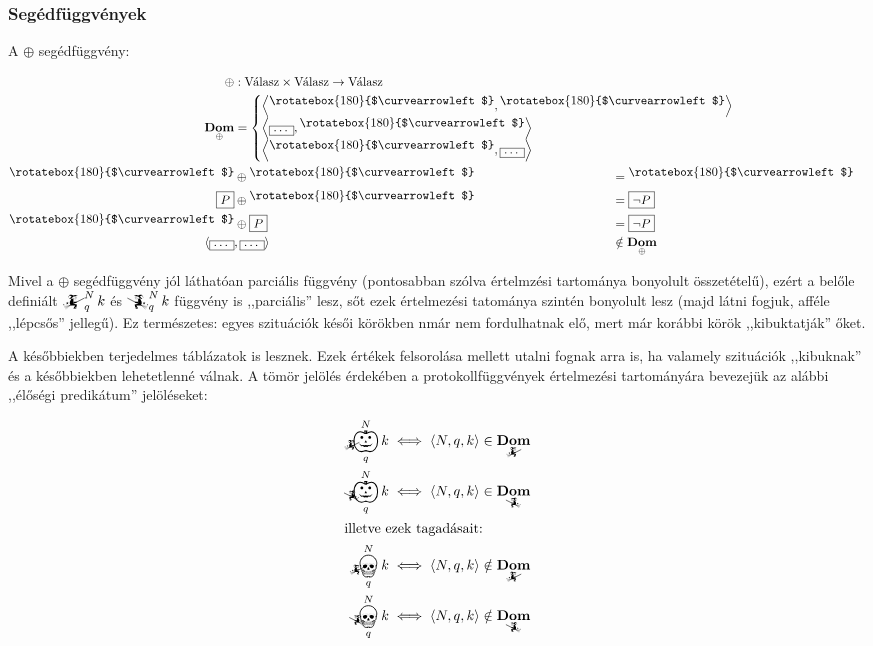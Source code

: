 \documentclass{article}
\newcommand{\nothing}{\text{\raisebox{0.4em}{\rotatebox{180}{$\curvearrowleft$}}}}%
\newcommand{\just}[1]{\boxed{#1}}%
\DeclareMathOperator{\dom}{\mathbf{Dom}}
\newcommand{\angled}[1]{\left\langle#1\right\rangle}
\newcommand{\mainfunA}[3]{\mathwitch_{#2}^{#1}#3}
\newcommand{\mainfunB}[3]{\reversemathwitch_{#2}^{#1}#3}
\newcommand{\nomainfunA}[3]{{}_{\mathwitch}\!\!\!\!\bigskull^{#1}_{#2}#3}
\newcommand{\nomainfunB}[3]{{}_{\reversemathwitch}\!\!\!\!\bigskull^{#1}_{#2}#3}
\newcommand{\yesmainfunA}[3]{{}_{\mathwitch}\!\!\!\!\bigpumpkin^{#1}_{#2}#3}
\newcommand{\yesmainfunB}[3]{{}_{\reversemathwitch}\!\!\!\!\bigpumpkin^{#1}_{#2}#3}
\begin{document}
	\subsubsection{Segédfüggvények}

	A $\oplus$ segédfüggvény:

	\begin{align*}
		\oplus &: \text{Válasz} \times \text{Válasz} \to \text{Válasz}\\
		\dom_\oplus &= \begin{cases}\angled{\nothing, \nothing}&\\\angled{\just\dots, \nothing}&\\\angled{\nothing, \just\dots}&\end{cases}\\
		\nothing   &\oplus \nothing            & &\mspace{-214mu}=  \nothing   \\
		\just P &\oplus \nothing            & &\mspace{-214mu}=  \just{\lnot P} \\
		\nothing   &\oplus \just P          & &\mspace{-214mu}=  \just{\lnot P} \\
		\langle\just\dots &, \just\dots\rangle & &\mspace{-214mu}\notin \dom_\oplus
	\end{align*}

	Mivel a $\oplus$ segédfüggvény jól láthatóan parciális függvény (pontosabban szólva értelmzési tartománya bonyolult összetételű), ezért a belőle definiált $\mainfunA Nqk$ és $\mainfunB Nqk$ függvény is ,,parciális'' lesz, sőt ezek értelmezési tatománya szintén bonyolult lesz (majd látni fogjuk, afféle ,,lépcsős'' jellegű). Ez természetes: egyes szituációk késői körökben nmár nem fordulhatnak elő, mert már korábbi körök ,,kibuktatják'' őket.

	A későbbiekben terjedelmes táblázatok is lesznek. Ezek értékek felsorolása mellett utalni fognak arra is, ha valamely szituációk ,,kibuknak'' és a későbbiekben lehetetlenné válnak. A tömör jelölés érdekében a protokollfüggvények értelmezési tartományára bevezejük az alábbi ,,élőségi predikátum'' jelöléseket:

	\begin{align}
		\yesmainfunA Nqk &\iff \angled{N,q,k}\in\dom_{\mathwitch} \\
		\yesmainfunB Nqk &\iff \angled{N,q,k}\in\dom_{\reversemathwitch} \\\intertext{illetve ezek tagadásait:}
		\nomainfunA  Nqk &\iff \angled{N,q,k}\notin\dom_{\mathwitch} \\
		\nomainfunB  Nqk &\iff \angled{N,q,k}\notin\dom_{\reversemathwitch}
	\end{align}
\end{document}
